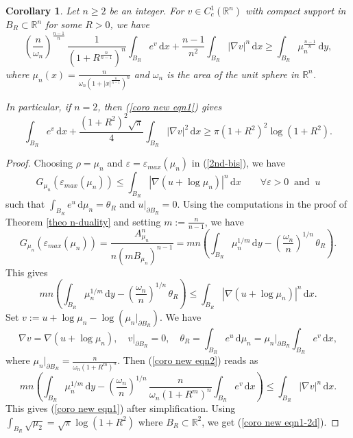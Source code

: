 \documentclass[10pt]{article}
\numberwithin{equation}{section}
\theoremstyle{plain}
\newtheorem{coro}[thm]{Corollary}
\theoremstyle{definition}
\theoremstyle{remark}
\newcommand\R{{\mathbb R}}
\newcommand{\ib}{\int_{B_R}}
\newcommand\vep{\varepsilon}
\newcommand\dd{\,\mbox{d} }
\begin{document}
\begin{coro}\label{coro new inequality}
Let $n\geq 2$ be an integer. For $v\in C^1_c(\R^n)$ with compact support in $B_R\subset \R^n$ for some $R>0$, we have
\begin{equation}\label{coro new eqn1}
\left(\frac{n}{\omega_n}\right)^{\frac{n-1}{n}} \,\frac{1}{(1+R^{\frac{n}{n-1}})^n} \ib e^v \dd x + \frac{n-1}{n^2} \ib |\nabla v|^n \dd x \geq  \ib \mu_n^{\frac{n-1}{n}}\dd y,
\end{equation}
where $\mu_n(x)=\frac{n}{\omega_n(1+|x|^{\frac{n}{n-1}})^n}$ and $\omega_n$ is the area of the unit sphere in $\R^n$.

In particular, if $n=2$, then (\ref{coro new eqn1}) gives
\begin{equation}\label{coro new eqn1-2d}
\ib e^v\dd x + \frac{(1+R^2)^2\sqrt{\pi}}{4} \ib |\nabla v|^2\dd x \geq \pi(1+R^2)^2\log(1+R^2). 
\end{equation}
\end{coro}
\begin{proof}
Choosing $\rho=\mu_n$ and $\vep=\vep_{max}(\mu_n)$ in (\ref{2nd-bis}), we have
\begin{equation}\label{coro new eqn2}
G_{\mu_n}(\vep_{max}(\mu_n)) \leq \ib |\nabla (u+\log\mu_n)|^n \dd x \qquad \forall \vep>0 \;\; \mbox{and}  \;\; u
\end{equation}
such that $\ib e^u\dd\mu_n =  \theta_R$ and $u\vert_{\partial B_R} = 0$.
Using the computations in the proof of Theorem  \ref{theo n-duality} and setting $m:=\frac{n}{n-1}$,  we have
\[G_{\mu_n}(\vep_{max}(\mu_n)) = \frac{A_{\mu_n}^n}{n(mB_{\mu_n})^{n-1}} = mn\left(\ib \mu_n^{1/m}\dd y - \left(\frac{\omega_n}{n}\right)^{1/n}\,\theta_R\right).\]
This gives 
\[ mn\left(\ib \mu_n^{1/m}\dd y - \left(\frac{\omega_n}{n}\right)^{1/n}\,\theta_R\right) \leq \ib |\nabla (u+\log\mu_n)|^n \dd x.\]
Set $v:=u+\log\mu_n-\log\left(\mu_n\vert_{\partial B_R}\right)$. We have 
\[\nabla v= \nabla(u+\log\mu_n), \quad v\vert_{\partial B_R}=0, \quad \theta_R=\ib e^u\dd\mu_n = \mu_n\vert_{\partial B_R} \ib e^v \dd x,\] 
where $\mu_n\vert_{\partial B_R} = \frac{n}{\omega_n(1+R^m)^n}$. Then (\ref{coro new eqn2}) reads as
\begin{equation}\label{coro new eqn3}
mn\left(\ib \mu_n^{1/m}\dd y - \left(\frac{\omega_n}{n}\right)^{1/n}\,\frac{n}{\omega_n(1+R^m)^n} \ib e^v\dd x\right)  \leq \ib |\nabla v|^n \dd x.
\end{equation}
This gives (\ref{coro new eqn1}) after simplification. Using $\ib \sqrt{\mu_2} = \sqrt{\pi}\log(1+R^2)$ where  $B_R\subset \R^2$, we get (\ref{coro new eqn1-2d}).
\end{proof}
\end{document}

